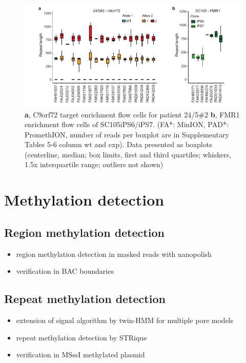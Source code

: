\begin{figure}[h]
    \centering
    \includegraphics[width=1.0\textwidth]{figures/strique/count_experiments.pdf}
    \captionsetup{format=plain}
    \caption[Repeat count cluster stability over experiments]{\textbf{a}, C9orf72 target enrichment flow cells for patient 24/5\#2 \textbf{b}, FMR1 enrichment flow cells of SC105iPS6/iPS7. (FA*: MinION, PAD*: PromethION, number of reads per boxplot are in Supplementary Tables 5-6 column wt and exp). Data presented as boxplots (centerline, median; box limits, first and third quartiles; whiskers, 1.5x interquartile range; outliers not shown)}
    \label{fig:strique:count_experiments}
\end{figure}




\section{Methylation detection}
\label{sec:strique:modifications}


\subsection{Region methylation detection}

\begin{itemize}
	\item region methylation detection in masked reads with nanopolish
	\item verification in BAC boundaries
\end{itemize}

\subsection{Repeat methylation detection}

\begin{itemize}
	\item extension of signal algorithm by twin-HMM for multiple pore models
	\item repeat methylation detection by STRique
	\item verification in MSssI methylated plasmid
\end{itemize}

